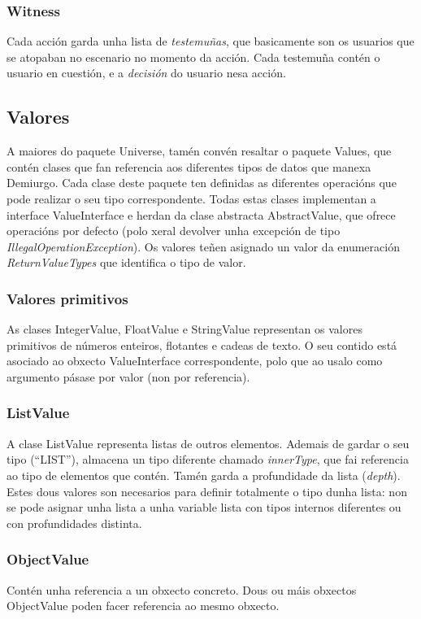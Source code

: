 \subsubsection{Witness}
Cada acción garda unha lista de \textit{testemuñas}, que basicamente son os
usuarios que se atopaban no escenario no momento da acción. Cada testemuña
contén o usuario en cuestión, e a \textit{decisión} do usuario nesa acción.

\subsection{Valores}
A maiores do paquete Universe, tamén convén resaltar o paquete Values, que
contén clases que fan referencia aos diferentes tipos de datos que manexa
Demiurgo. Cada clase deste paquete ten definidas as diferentes operacións que
pode realizar o seu tipo correspondente. Todas estas clases implementan a
interface ValueInterface e herdan da clase abstracta AbstractValue, que ofrece
operacións por defecto (polo xeral devolver unha excepción de tipo
\textit{IllegalOperationException}). Os valores teñen asignado un valor da
enumeración \textit{ReturnValueTypes} que identifica o tipo de valor.
\subsubsection{Valores primitivos}
As clases IntegerValue, FloatValue e StringValue representan os valores
primitivos de números enteiros, flotantes e cadeas de texto. O seu contido está
asociado ao obxecto ValueInterface correspondente, polo que ao usalo como
argumento pásase por valor (non por referencia).
\subsubsection{ListValue}
A clase ListValue representa listas de outros elementos. Ademais de gardar o seu
tipo (``LIST''), almacena un tipo diferente chamado \textit{innerType}, que fai
referencia ao tipo de elementos que contén. Tamén garda a profundidade da lista
(\textit{depth}). Estes dous valores son necesarios para definir totalmente o
tipo dunha lista: non se pode asignar unha lista a unha variable lista con tipos
internos diferentes ou con profundidades distinta.
\subsubsection{ObjectValue}
Contén unha referencia a un obxecto concreto. Dous ou máis obxectos ObjectValue
poden facer referencia ao mesmo obxecto.
